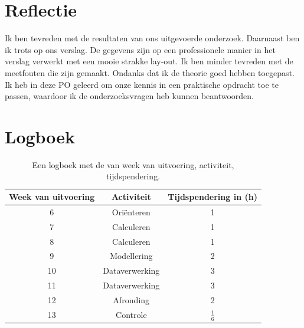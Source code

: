\documentclass[numbers=endperiod]{scrartcl}
\begin{document}
\section{Reflectie}
Ik ben tevreden met de resultaten van ons uitgevoerde onderzoek. Daarnaast
ben ik trots op ons verslag. De gegevens zijn op een professionele
manier in het verslag verwerkt met een mooie strakke lay-out. Ik ben minder
tevreden met de meetfouten die zijn gemaakt. Ondanks dat ik de theorie
goed hebben toegepast. Ik heb in deze PO geleerd om onze kennis in
een praktische opdracht toe te passen, waardoor ik de onderzoeksvragen
heb kunnen beantwoorden.


\newpage        
\appendix
\section{Logboek}
\begin{table}[ht]
\centering
\caption{Een logboek met de van week van uitvoering, activiteit, tijdspendering.}
\begin{tabular}{Scc}
\toprule
{Week van uitvoering} & Activiteit & Tijdspendering in (\si{\hour})\\
 & Oriënteren & 1\\
7 & Calculeren & 1\\
8 & Calculeren & 1\\
9 & Modellering & 2\\
10 & Dataverwerking & 3\\
11 & Dataverwerking & 3\\
12 & Afronding & 2\\
13 & Controle & $\frac{1}{6}$\\
\bottomrule
\end{tabular}
\end{table}
\end{document}
